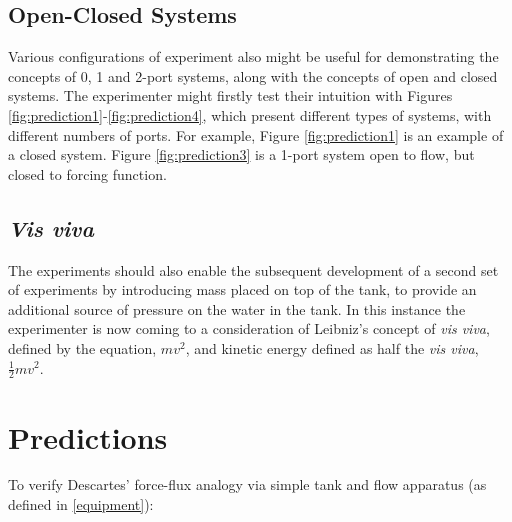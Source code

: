 \documentclass{article}
\begin{document}
\subsection{Open-Closed Systems}

Various configurations of experiment also might be useful for demonstrating the concepts of 0, 1 and 2-port systems, along with the concepts of open and closed systems. The experimenter might firstly test their intuition with Figures \ref{fig:prediction1}-\ref{fig:prediction4}, which present different types of systems, with different numbers of ports.
For example, Figure \ref{fig:prediction1} is an example of a closed system. Figure \ref{fig:prediction3} is a 1-port system open to flow, but closed to forcing function.

\subsection{\textit{Vis viva}}

The experiments should also enable the subsequent development of a second set of experiments by introducing mass placed on top of the tank, to provide an additional source of pressure on the water in the tank. In this instance the experimenter is now coming to a consideration of Leibniz's concept of \textit{vis viva}, defined by the equation, $mv^{2}$, and kinetic energy defined as half the \textit{vis viva}, $\frac{1}{2}mv^{2}$.




\section{Predictions}

To verify Descartes' force-flux analogy via simple tank and flow apparatus (as defined in \ref{equipment}):
\end{document}
